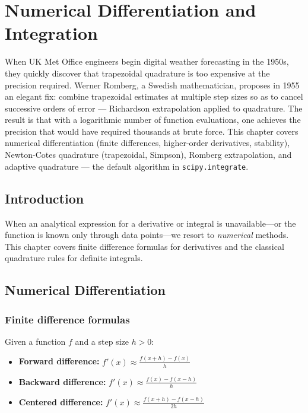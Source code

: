 
\chapter{Numerical Differentiation and Integration}
\label{ch:differentiation-integration}


When UK Met Office engineers begin digital weather forecasting in the 1950s, they quickly discover that trapezoidal quadrature is too expensive at the precision required. Werner Romberg, a Swedish mathematician, proposes in 1955 an elegant fix: combine trapezoidal estimates at multiple step sizes so as to cancel successive orders of error --- Richardson extrapolation applied to quadrature. The result is that with a logarithmic number of function evaluations, one achieves the precision that would have required thousands at brute force. This chapter covers numerical differentiation (finite differences, higher-order derivatives, stability), Newton-Cotes quadrature (trapezoidal, Simpson), Romberg extrapolation, and adaptive quadrature --- the default algorithm in \texttt{scipy.integrate}.

\section{Introduction}

When an analytical expression for a derivative or integral is unavailable---or the function is known only through data points---we resort to \emph{numerical} methods. This chapter covers finite difference formulas for derivatives and the classical quadrature rules for definite integrals.

\section{Numerical Differentiation}

\subsection{Finite difference formulas}

\begin{definition}
\label{def:finite-differences}
Given a function $f$ and a step size $h > 0$:
\begin{itemize}
    \item \textbf{Forward difference:} $\displaystyle f'(x) \approx \frac{f(x+h) - f(x)}{h}$
    \item \textbf{Backward difference:} $\displaystyle f'(x) \approx \frac{f(x) - f(x-h)}{h}$
    \item \textbf{Centered difference:} $\displaystyle f'(x) \approx \frac{f(x+h) - f(x-h)}{2h}$
\end{itemize}
\end{definition}

